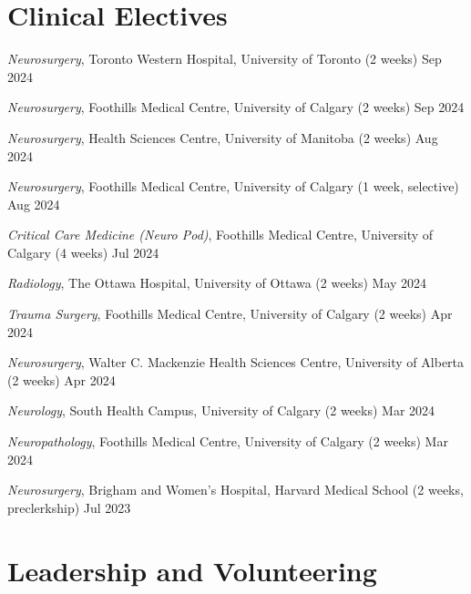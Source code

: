 \documentclass{article}
\begin{document}
\section*{\textcolor{my_colour}{Clinical Electives}}
\vspace{-.25em} \hrulefill \vspace{.25em}

\textit{Neurosurgery}, Toronto Western Hospital, University of Toronto (2 weeks) \hfill Sep 2024

\textit{Neurosurgery}, Foothills Medical Centre, University of Calgary (2 weeks) \hfill Sep 2024

\textit{Neurosurgery}, Health Sciences Centre, University of Manitoba (2 weeks) \hfill Aug 2024

\textit{Neurosurgery}, Foothills Medical Centre, University of Calgary (1 week, selective) \hfill Aug 2024

\textit{Critical Care Medicine (Neuro Pod)}, Foothills Medical Centre, University of Calgary (4 weeks) \hfill Jul 2024

\textit{Radiology}, The Ottawa Hospital, University of Ottawa (2 weeks) \hfill May 2024

\textit{Trauma Surgery}, Foothills Medical Centre, University of Calgary (2 weeks) \hfill Apr 2024

\textit{Neurosurgery}, Walter C. Mackenzie Health Sciences Centre, University of Alberta (2 weeks) \hfill Apr 2024

\textit{Neurology}, South Health Campus, University of Calgary (2 weeks) \hfill Mar 2024

\textit{Neuropathology}, Foothills Medical Centre, University of Calgary (2 weeks) \hfill Mar 2024

\textit{Neurosurgery}, Brigham and Women's Hospital, Harvard Medical School (2 weeks, preclerkship) \hfill Jul 2023


\section*{\textcolor{my_colour}{Leadership and Volunteering}}
\vspace{-.25em} \hrulefill \vspace{.25em}
\end{document}
